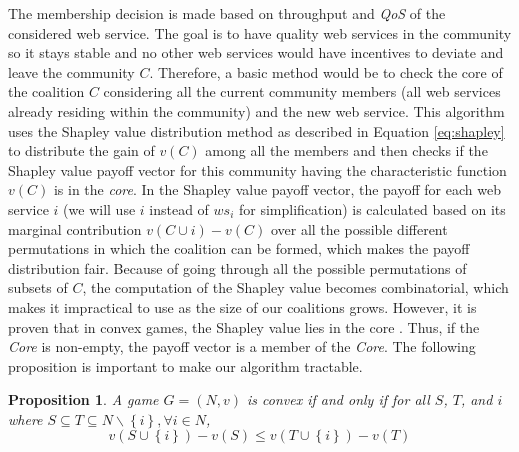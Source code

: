 \documentclass[10pt,journal,cspaper,compsoc]{IEEEtran}
\begin{document}
The membership decision is made based on throughput and \emph{QoS}
of the considered web service. The goal is to have quality web
services in the community so it stays stable and no other web
services would have incentives to deviate and leave the community
$C$. Therefore, a basic method would be to check the core of the
coalition $C$ considering all the current community members (all
web services already residing within the community) and the new
web service. This algorithm uses the Shapley value distribution
method as described in Equation \ref{eq:shapley} to distribute the
gain of $v(C)$ among all the members and then checks if the
Shapley value payoff vector for this community having the
characteristic function $v(C)$ is in the \emph{core}. In the
Shapley value payoff vector, the payoff for each web service $i$
(we will use $i$ instead of $ws_i$ for simplification) is
calculated based on its marginal contribution $v(C \cup {i}) -
v(C)$ over all the possible different permutations in which the
coalition can be formed, which makes the payoff distribution fair.
Because of going through all the possible permutations of subsets
of $C$, the computation of the Shapley value becomes
combinatorial, which makes it impractical to use as the size of
our coalitions grows. However, it is proven that in convex games,
the Shapley value lies in the core
\cite{DBLP:conf/ijcai/GrecoMPS11, myerson1991game}. Thus, if the
\emph{Core} is non-empty, the payoff vector is a member of the
\emph{Core}. The following proposition is important to make our
algorithm tractable.


\newtheorem{theorem}{Proposition}
\begin{theorem}\label{proposition1}
A game $G =(N, v)$ is convex if and only if for all $S$, $T$, and
$i$ where $S \subseteq T \subseteq N \backslash \left\{i\right\},
\forall i \in N$,
\begin{equation}\label{eq:convex_snow}
v(S \cup \left\{i\right\}) - v(S) \leq v (T \cup \left\{i\right\})
- v(T)
\end{equation}
\end{theorem}

\end{document}
